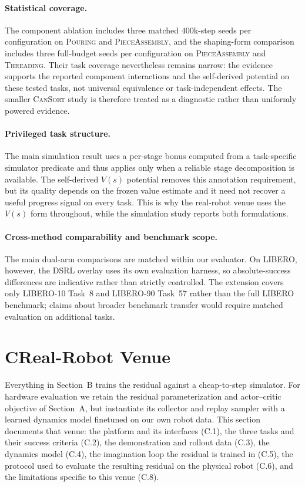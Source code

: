 \documentclass[letterpaper]{article} %
\begin{document}
\paragraph{Statistical coverage.}
The component ablation includes three matched $400$k-step seeds per
configuration on \textsc{Pouring} and \textsc{PieceAssembly}, and the
shaping-form comparison includes three full-budget seeds per configuration on
\textsc{PieceAssembly} and \textsc{Threading}. Their task coverage nevertheless
remains narrow: the evidence supports the reported component interactions and
the self-derived potential on these tested tasks, not universal equivalence or
task-independent effects. The smaller \textsc{CanSort} study is therefore
treated as a diagnostic rather than uniformly powered evidence.

\paragraph{Privileged task structure.}
The main simulation result uses a per-stage bonus computed from a task-specific
simulator predicate and thus applies only when a reliable stage decomposition is
available. The self-derived $V(s)$ potential removes this annotation requirement,
but its quality depends on the frozen value estimate and it need not recover a useful
progress signal on every task. This is why the real-robot venue uses the $V(s)$ form
throughout, while the simulation study reports both formulations.

\paragraph{Cross-method comparability and benchmark scope.}
The main dual-arm comparisons are matched within our evaluator. On LIBERO,
however, the DSRL overlay uses its own evaluation
harness, so absolute-success differences are indicative rather than strictly
controlled. The extension covers only LIBERO-10 Task~8 and LIBERO-90 Task~57
rather than the full LIBERO benchmark; claims about broader benchmark transfer
would require matched evaluation on additional tasks.

\section{C\quad Real-Robot Venue}

Everything in Section~B trains the residual against a cheap-to-step simulator. For
hardware evaluation we retain the residual parameterization and actor--critic objective of
Section~A, but instantiate its collector and replay sampler with a learned dynamics model
finetuned on our own robot data. This section documents that venue: the platform and its
interfaces (C.1), the three tasks and their success
criteria (C.2), the demonstration and rollout data (C.3), the dynamics model (C.4),
the imagination loop the residual is trained in (C.5), the protocol used to evaluate
the resulting residual on the physical robot (C.6), and the limitations specific to
this venue (C.8).
\end{document}
